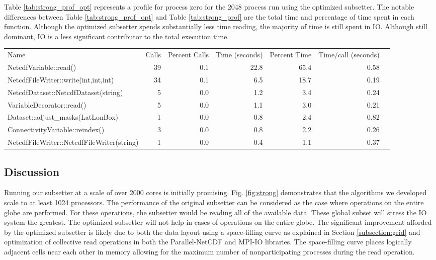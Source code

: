 Table \ref{tab:strong_prof_opt} represents a profile for process zero for the
2048 process run using the optimized subsetter.  The notable differences
between Table \ref{tab:strong_prof_opt} and Table \ref{tab:strong_prof} are
the total time and percentage of time spent in each function.  Although the
optimized subsetter spends substantially less time reading, the majority of
time is still spent in IO.  Although still dominant, IO is a less significant
contributor to the total execution time.

\begin{table*}[!t]
\center
\caption{Partial Profile for Process 0 at 2048 Cores - MJO Region - Optimized}
\label{tab:strong_prof_opt}
\begin{tabular}{lrrrrrr}
Name&Calls&Percent Calls&Time (seconds)&Percent Time&Time/call (seconds)\\
NetcdfVariable::read()                    & 39&0.1&22.8&65.4&0.58\\
NetcdfFileWriter::write(int,int,int)      & 34&0.1& 6.5&18.7&0.19\\
NetcdfDataset::NetcdfDataset(string)      &  5&0.0& 1.2& 3.4&0.24\\
VariableDecorator::read()                 &  5&0.0& 1.1& 3.0&0.21\\
Dataset::adjust\_masks(LatLonBox)         &  1&0.0& 0.8& 2.4&0.82\\
ConnectivityVariable::reindex()           &  3&0.0& 0.8& 2.2&0.26\\
NetcdfFileWriter::NetcdfFileWriter(string)&  1&0.0& 0.4& 1.1&0.37\\
\end{tabular}
\end{table*}

\subsection{Discussion}

Running our subsetter at a scale of over 2000 cores is initially promising.
Fig. \ref{fig:strong} demonstrates that the algorithms we developed scale to
at least 1024 processors.  The performance of the original subsetter can be
considered as the case where operations on the entire globe are performed. For
these operations, the subsetter would be reading all of the available data.
These global subset will stress the IO system the greatest.  The optimized
subsetter will not help in cases of operations on the entire globe.  The
significant improvement afforded by the optimized subsetter is likely due to
both the data layout using a space-filling curve as explained in Section
\ref{subsection:grid} and optimization of collective read operations in both
the Parallel-NetCDF and MPI-IO libraries.  The space-filling curve places
logically adjacent cells near each other in memory allowing for the maximum
number of nonparticipating processes during the read operation.

